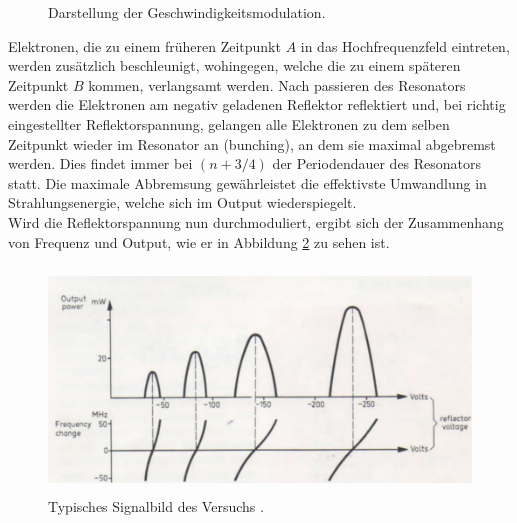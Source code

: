 \begin{figure}
  \centering
  \caption{Darstellung der Geschwindigkeitsmodulation.}
  \label{fig:mod}
\end{figure}

Elektronen, die zu einem früheren Zeitpunkt $A$ in das Hochfrequenzfeld eintreten, werden zusätzlich beschleunigt, wohingegen, welche die zu einem späteren Zeitpunkt $B$ kommen, verlangsamt werden.
Nach passieren des Resonators werden die Elektronen am negativ geladenen Reflektor reflektiert und, bei richtig eingestellter Reflektorspannung, gelangen alle Elektronen zu dem selben Zeitpunkt wieder im Resonator an (bunching), an dem sie maximal abgebremst werden.
Dies findet immer bei $(n+3/4)$ der Periodendauer des Resonators statt.
Die maximale Abbremsung gewährleistet die effektivste Umwandlung in Strahlungsenergie, welche sich im Output wiederspiegelt.\\
Wird die Reflektorspannung nun durchmoduliert, ergibt sich der Zusammenhang von Frequenz und Output, wie er in Abbildung \ref{fig:output} zu sehen ist.

\begin{figure}
  \centering
  \includegraphics[height=6cm]{ressources/output.png}
  \caption{Typisches Signalbild des Versuchs \cite{skript}.}
  \label{fig:output}
\end{figure}

